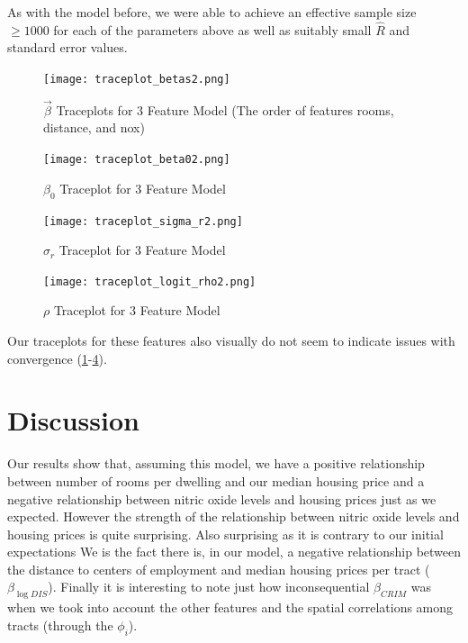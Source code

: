 \documentclass[11pt]{article}
\begin{document}
As with the model before, we were able to achieve an effective sample size $\geq 1000$ for each of the parameters above as well as suitably small $\hat{R}$ and standard error values. 

\begin{figure}[h!] 
	\centering
  \texttt{[image: traceplot\_betas2.png]}
  \caption{$\vec{\beta}$ Traceplots for 3 Feature Model (The order of features rooms, distance, and nox)}
  \label{fig:tbetas2}
\end{figure}

\begin{figure}[h!] 
	\centering
  \texttt{[image: traceplot\_beta02.png]}
  \caption{$\beta_0$ Traceplot for 3 Feature Model}
  \label{fig:tbeta02}
\end{figure}

\begin{figure}[h!] 
	\centering
  \texttt{[image: traceplot\_sigma\_r2.png]}
  \caption{$\sigma_r$ Traceplot for 3 Feature Model}
  \label{fig:tsigma_r2}
\end{figure}

\begin{figure}[h!] 
	\centering
  \texttt{[image: traceplot\_logit\_rho2.png]}
  \caption{$\rho$ Traceplot for 3 Feature Model}
  \label{fig:tlogit_rho2}
\end{figure}

\FloatBarrier

Our traceplots for these features also visually do not seem to indicate issues with convergence (\ref{fig:tbetas2}-\ref{fig:tlogit_rho2}). 

\newpage

\section{Discussion}

Our results show that, assuming this model, we have a positive relationship between number of rooms per dwelling and our median housing price and a negative relationship between nitric oxide levels and housing prices just as we expected. However the strength of the relationship between nitric oxide levels and housing prices is quite surprising. Also surprising as it is contrary to our initial expectations We  is the fact there is, in our model, a negative relationship between the distance to centers of employment and median housing prices per tract ($\beta_{\log{DIS}}$). Finally it is interesting to note just how inconsequential $\beta_{CRIM}$ was when we took into account the other features and the spatial correlations among tracts (through the $\phi_i$). \newline
\end{document}
